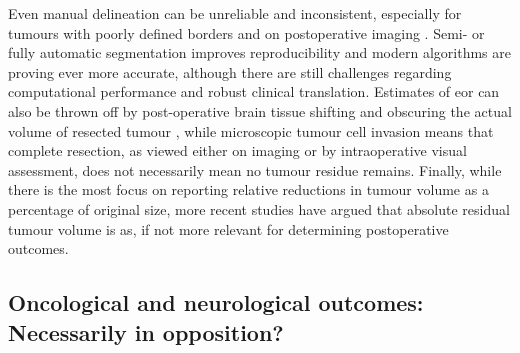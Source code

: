 Even manual delineation can be unreliable and inconsistent, especially for tumours with poorly defined borders and on postoperative imaging \autocite{Ertl-Wagner2009,Bo2017,Visser2019}.
Semi- or fully automatic segmentation improves reproducibility\autocite{Ertl-Wagner2009,Sezer2020} and modern algorithms are proving ever more accurate, although there are still challenges regarding computational performance and robust clinical translation\autocite{Angulakshmi2017,Wadhwa2019,Fawzi2021}.
Estimates of \gls{eor} can also be thrown off  by post-operative brain tissue shifting and obscuring the actual volume of resected tumour \autocite{Schucht2014a}, while microscopic tumour cell invasion means that complete resection, as viewed either on imaging or by intraoperative visual assessment, does not necessarily mean no tumour residue remains\autocite{Yordanova2017}.
Finally, while there is the most focus on reporting relative reductions in tumour volume as a percentage of original size, more recent studies have argued that absolute residual tumour volume is as, if not more relevant for determining postoperative outcomes\autocite{Ius2012,Rincon-Torroella2019,Smith2008,Karschnia2021}.

\subsection{Oncological and neurological outcomes: Necessarily in opposition?}

